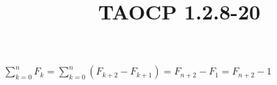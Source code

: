 \documentclass{article}
\title{TAOCP 1.2.8\mbox{-}20}
\begin{document}
\maketitle

\( \sum_{k=0}^{n} F_{k} = \sum_{k=0}^{n}(F_{k+2}-F_{k+1}) = F_{n+2}-F_{1} = F_{n+2} - 1 \)
\end{document}
